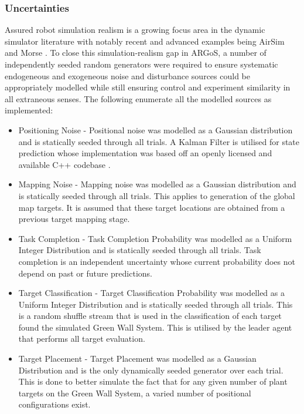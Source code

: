 \documentclass{report}
\begin{document}
\subsubsection{Uncertainties}
Assured robot simulation realism is a growing focus area \cite{Taylor2014} in the dynamic simulator literature with notably recent and advanced examples being AirSim \cite{Shah2018} and Morse \cite{Morse2011} \cite{Lemaignan2014}. To close this simulation-realism gap in ARGoS, a number of independently seeded random generators were required to ensure systematic endogeneous and exogeneous noise and disturbance sources could be appropriately modelled while still ensuring control and experiment similarity in all extraneous senses. The following enumerate all the modelled sources as implemented:

\begin{itemize}
	\item Positioning Noise - Positional noise was modelled as a Gaussian distribution and is statically seeded through all trials. A Kalman Filter is utilised for state prediction whose implementation was based off an openly licensed and available C++ codebase \cite{KALMAN2015}.
	\item Mapping Noise - Mapping noise was modelled as a Gaussian distribution and is statically seeded through all trials. This applies to generation of the global map targets. It is assumed that these target locations are obtained from a previous target mapping stage.
	\item Task Completion - Task Completion Probability was modelled as a Uniform Integer Distribution and is statically seeded through all trials. Task completion is an independent uncertainty whose current probability does not depend on past or future predictions.
	\item Target Classification - Target Classification Probability was modelled as a Uniform Integer Distribution and is statically seeded through all trials. This is a random shuffle stream that is used in the classification of each target found the simulated Green Wall System. This is utilised by the leader agent that performs all target evaluation.
	\item Target Placement - Target Placement was modelled as a Gaussian Distribution and is the only dynamically seeded generator over each trial. This is done to better simulate the fact that for any given number of plant targets on the Green Wall System, a varied number of positional configurations exist.
\end{itemize}
\end{document}

